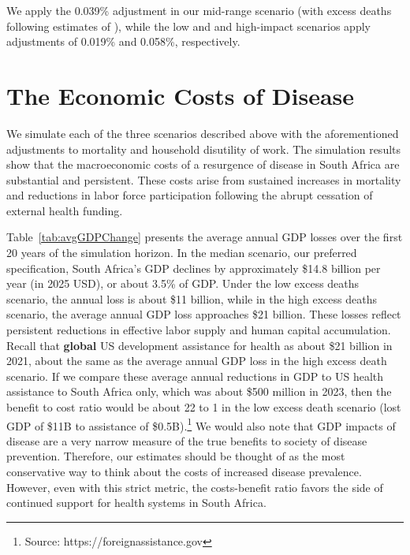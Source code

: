 \documentclass[letterpaper,12pt]{article}
\theoremstyle{definition}
\begin{document}
\begin{spacing}{1.5}
We apply the 0.039\% adjustment in our mid-range scenario (with excess deaths following estimates of \citet{Gandhi2025}), while the low and and high-impact scenarios apply adjustments of 0.019\% and 0.058\%, respectively.




\section{The Economic Costs of Disease}\label{SecResults}

We simulate each of the three scenarios described above with the aforementioned adjustments to mortality and household disutility of work.  The simulation results show that the macroeconomic costs of a resurgence of disease in South Africa are substantial and persistent. These costs arise from sustained increases in mortality and reductions in labor force participation following the abrupt cessation of external health funding.

Table~\ref{tab:avgGDPChange} presents the average annual GDP losses over the first 20 years of the simulation horizon. In the median scenario, our preferred specification, South Africa's GDP declines by approximately \$14.8 billion per year (in 2025 USD), or about 3.5\% of GDP. Under the low excess deaths scenario, the annual loss is about \$11 billion, while in the high excess deaths scenario, the average annual GDP loss approaches \$21 billion. These losses reflect persistent reductions in effective labor supply and human capital accumulation.  Recall that \textbf{global} US development assistance for health as about \$21 billion in 2021, about the same as the average annual GDP loss in the high excess death scenario.  If we compare these average annual reductions in GDP to US health assistance to South Africa only, which was about \$500 million in 2023, then the benefit to cost ratio would be about 22 to 1 in the low excess death scenario (lost GDP of \$11B to assistance of \$0.5B).\footnote{Source: https://foreignassistance.gov} We would also note that GDP impacts of disease are a very narrow measure of the true benefits to society of disease prevention.  Therefore, our estimates should be thought of as the most conservative way to think about the costs of increased disease prevalence. However, even with this strict metric, the costs-benefit ratio favors the side of continued support for health systems in South Africa.


\end{spacing}
\end{document}
